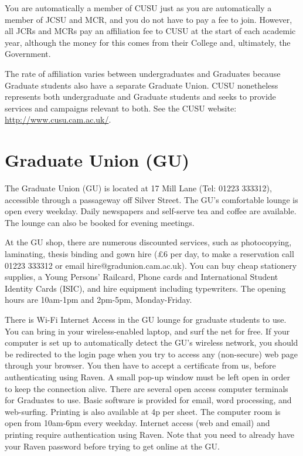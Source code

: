 \documentclass[11pt,fleqn, oneside]{book} %
\begin{document}
You are automatically a member of CUSU just as you are automatically a member of JCSU and MCR, and you do not have to pay a fee to join. However, all JCRs and MCRs pay an affiliation fee to CUSU at the start of each academic year, although the money for this comes from their College and, ultimately, the Government. 
    
The rate of affiliation varies between undergraduates and Graduates because Graduate students also have a separate Graduate Union. CUSU nonetheless represents both undergraduate and Graduate students and seeks to provide services and campaigns relevant to both.
See the CUSU website: \url{http://www.cusu.cam.ac.uk/}.
    
\section{Graduate Union (GU)}
    
The Graduate Union (GU) is located at 17 Mill Lane (Tel: 01223 333312), accessible through a passageway off Silver Street.  The GU's comfortable lounge is open every weekday.  Daily newspapers and self-serve tea and coffee are available.  The lounge can also be booked for evening meetings. 
    
At the GU shop, there are numerous discounted services, such as photocopying, laminating, thesis binding and gown hire (£6 per day, to make a reservation call 01223 333312 or email hire@gradunion.cam.ac.uk).  You can buy cheap stationery supplies, a Young Persons’ Railcard, Phone cards and International Student Identity Cards (ISIC), and hire equipment including typewriters.  The opening hours are 10am-1pm and 2pm-5pm, Monday-Friday. 
    
There is Wi-Fi Internet Access in the GU lounge for graduate students to use.  You can bring in your wireless-enabled laptop, and surf the net for free. If your computer is set up to automatically detect the GU's wireless network, you should be redirected to the login page when you try to access any (non-secure) web page through your browser. You then have to accept a certificate from us, before authenticating using Raven. A small pop-up window must be left open in order to keep the connection alive.
There are several open access computer terminals for Graduates to use. Basic software is provided for email, word processing, and web-surfing. Printing is also available at 4p per sheet. The computer room is open from 10am-6pm every weekday. Internet access (web and email) and printing require authentication using Raven.  Note that you need to already have your Raven password before trying to get online at the GU.
    
\end{document}
